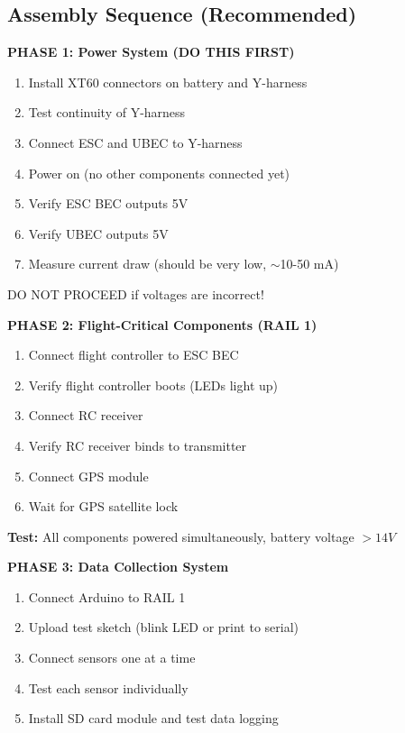 \documentclass[11pt,letterpaper]{article}
\begin{document}
\subsection{Assembly Sequence (Recommended)}

\textbf{PHASE 1: Power System (DO THIS FIRST)}
\begin{enumerate}
\item Install XT60 connectors on battery and Y-harness
\item Test continuity of Y-harness
\item Connect ESC and UBEC to Y-harness
\item Power on (no other components connected yet)
\item Verify ESC BEC outputs 5V
\item Verify UBEC outputs 5V
\item Measure current draw (should be very low, $\sim$10-50 mA)
\end{enumerate}

\begin{warningbox}
DO NOT PROCEED if voltages are incorrect!
\end{warningbox}

\textbf{PHASE 2: Flight-Critical Components (RAIL 1)}
\begin{enumerate}
\item Connect flight controller to ESC BEC
\item Verify flight controller boots (LEDs light up)
\item Connect RC receiver
\item Verify RC receiver binds to transmitter
\item Connect GPS module
\item Wait for GPS satellite lock
\end{enumerate}

\textbf{Test:} All components powered simultaneously, battery voltage $> 14V$

\textbf{PHASE 3: Data Collection System}
\begin{enumerate}
\item Connect Arduino to RAIL 1
\item Upload test sketch (blink LED or print to serial)
\item Connect sensors one at a time
\item Test each sensor individually
\item Install SD card module and test data logging
\end{enumerate}
\end{document}

